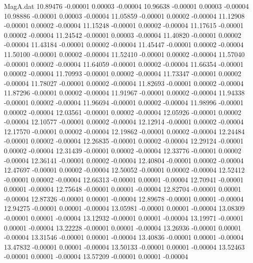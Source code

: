 \begin{filecontents}{MagA.dat}
  10.89476   -0.00001    0.00003   -0.00004
  10.96638   -0.00001    0.00003   -0.00004
  10.98886   -0.00001    0.00003   -0.00004
  11.05859   -0.00001    0.00002   -0.00004
  11.12908   -0.00001    0.00002   -0.00004
  11.15248   -0.00001    0.00002   -0.00004
  11.17615   -0.00001    0.00002   -0.00004
  11.24542   -0.00001    0.00003   -0.00004
  11.40820   -0.00001    0.00002   -0.00004
  11.43184   -0.00001    0.00002   -0.00004
  11.45447   -0.00001    0.00002   -0.00004
  11.50100   -0.00001    0.00002   -0.00004
  11.52410   -0.00001    0.00002   -0.00004
  11.57040   -0.00001    0.00002   -0.00004
  11.64059   -0.00001    0.00002   -0.00004
  11.66354   -0.00001    0.00002   -0.00004
  11.70993   -0.00001    0.00002   -0.00004
  11.73347   -0.00001    0.00002   -0.00004
  11.78027   -0.00001    0.00002   -0.00004
  11.82693   -0.00001    0.00002   -0.00004
  11.87296   -0.00001    0.00002   -0.00004
  11.91967   -0.00001    0.00002   -0.00004
  11.94338   -0.00001    0.00002   -0.00004
  11.96694   -0.00001    0.00002   -0.00004
  11.98996   -0.00001    0.00002   -0.00004
  12.03561   -0.00001    0.00002   -0.00004
  12.05926   -0.00001    0.00002   -0.00004
  12.10577   -0.00001    0.00002   -0.00004
  12.12914   -0.00001    0.00002   -0.00004
  12.17570   -0.00001    0.00002   -0.00004
  12.19862   -0.00001    0.00002   -0.00004
  12.24484   -0.00001    0.00002   -0.00004
  12.26835   -0.00001    0.00002   -0.00004
  12.29124   -0.00001    0.00002   -0.00004
  12.31439   -0.00001    0.00002   -0.00004
  12.33776   -0.00001    0.00002   -0.00004
  12.36141   -0.00001    0.00002   -0.00004
  12.40804   -0.00001    0.00002   -0.00004
  12.47697   -0.00001    0.00002   -0.00004
  12.50052   -0.00001    0.00002   -0.00004
  12.52412   -0.00001    0.00002   -0.00004
  12.66313   -0.00001    0.00001   -0.00004
  12.70941   -0.00001    0.00001   -0.00004
  12.75648   -0.00001    0.00001   -0.00004
  12.82704   -0.00001    0.00001   -0.00004
  12.87326   -0.00001    0.00001   -0.00004
  12.89678   -0.00001    0.00001   -0.00004
  12.94275   -0.00001    0.00001   -0.00004
  13.05981   -0.00001    0.00001   -0.00004
  13.08309   -0.00001    0.00001   -0.00004
  13.12932   -0.00001    0.00001   -0.00004
  13.19971   -0.00001    0.00001   -0.00004
  13.22228   -0.00001    0.00001   -0.00004
  13.26936   -0.00001    0.00001   -0.00004
  13.31546   -0.00001    0.00001   -0.00004
  13.40836   -0.00001    0.00001   -0.00004
  13.47832   -0.00001    0.00001   -0.00004
  13.50133   -0.00001    0.00001   -0.00004
  13.52463   -0.00001    0.00001   -0.00004
  13.57209   -0.00001    0.00001   -0.00004

\end{filecontents}

